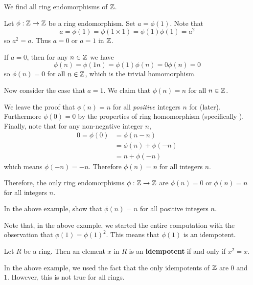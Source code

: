 \begin{example}\label{example-endomorphisms-of-Z}
    We find all ring endomorphisms of $\mathbb{Z}$.

    Let $\phi:\mathbb{Z}\to\mathbb{Z}$ be a ring endomorphism. Set $a = \phi(1)$. Note that
    \[
        a = \phi(1) = \phi(1\times1) = \phi(1)\phi(1) = a^2
    \]
    so $a^2 = a$. Thus $a = 0$ or $a = 1$ in $\mathbb{Z}$.

    If $a = 0$, then for any $n \in \mathbb{Z}$ we have
    \[
        \phi(n) = \phi(1n) = \phi(1)\phi(n) = 0\phi(n) = 0
    \]
    so $\phi(n) = 0$ for all $n \in \mathbb{Z}$, which is the trivial homomorphism.

    Now consider the case that $a = 1$. We claim that $\phi(n) = n$ for all $n \in \mathbb{Z}$.

    We leave the proof that $\phi(n) = n$ for all \textit{positive} integers $n$ for  (later). Furthermore $\phi(0) = 0$ by the properties of ring homomorphism (specifically ). Finally, note that for any non-negative integer $n$,
    \begin{align*}
        0 = \phi(0) &= \phi(n - n)\\
        &= \phi(n) + \phi(-n)\\
        &= n + \phi(-n)
    \end{align*}
    which means $\phi(-n) = -n$. Therefore $\phi(n) = n$ for all integers $n$.

    Therefore, the only ring endomorphisms $\phi:\mathbb{Z}\to\mathbb{Z}$ are $\phi(n) = 0$ or $\phi(n) = n$ for all integers $n$.
\end{example}
\begin{exercise}\label{exercise-homomorphism-maps-n-to-n-if-n-is-positive}
    In the above example, show that $\phi(n) = n$ for all positive integers $n$.
\end{exercise}
Note that, in the above example, we started the entire computation with the observation that $\phi(1) = \phi(1)^2$. This means that $\phi(1)$ is an idempotent.
\begin{definition}
    Let $R$ be a ring. Then an element $x$ in $R$ is an \textbf{idempotent} if and only if $x^2 = x$.
\end{definition}
In the above example, we used the fact that the only idempotents of $\mathbb{Z}$ are 0 and 1. However, this is not true for all rings.

